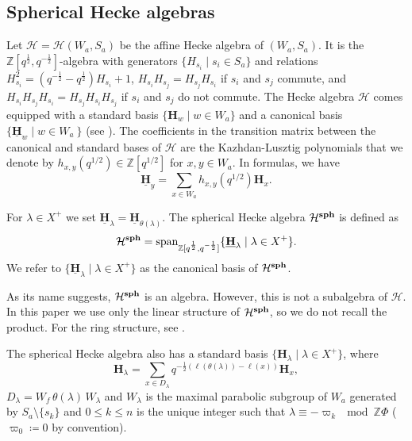 \subsection{Spherical Hecke algebras}


Let $\mathcal{H} = \mathcal{H}(W_{a}, S_a)$  be the affine Hecke algebra of $(W_a,S_a)$. 
It is the $\mathbb{Z}[q^{\frac{1}{2}},q^{-\frac{1}{2}}]$-algebra  with generators $\{H_{s_i} \mid s_i \in S_a\}$ and relations 
$H_{s_i}^2 = (q^{-\frac{1}{2}} -q^{\frac{1}{2}})H_{s_i}+1$, $H_{s_i}H_{s_j}=H_{s_j}H_{s_i}$ if $s_i$ and $s_j$ commute, and   $H_{s_i}H_{s_j}H_{s_{i}} =H_{s_j}H_{s_i}H_{s_j}$ if $s_i$ and $s_j$ do not commute. 
The Hecke algebra $\mathcal{H}$ comes equipped with a  standard basis $\{\mathbf{H}_w \mid w\in W_a\}$ and a canonical basis $\{ \underline{\mathbf{H}}_{w} \mid w\in W_a \ \}$ 
(see \cite{Lusztig1979,Soergel1997KazhdanLusztigPA}).
The coefficients in the transition matrix between the canonical and standard bases of $\mathcal{H}$ are the Kazhdan-Lusztig polynomials that we denote by $h_{x,y}(q^{1/2})\in \mathbb{Z}[q^{1/2}]$ for $x, y \in W_a$. 
In formulas, we have
\begin{equation}
    \underline{\mathbf{H}}_y = \sum_{x\in W_a} h_{x,y}(q^{1/2}) \mathbf{H}_x. 
\end{equation}

\begin{definition}\rm
   For $\lambda \in X^+$ we set 
$\underline{\mathbf{H}}_{\lambda} = \underline{\mathbf{H}}_{\theta (\lambda)}$. 
The spherical Hecke algebra $\mathcal{H}^{\textbf{sph}} $ is defined as
\begin{equation}
    \mathcal{H}^{\textbf{sph}} = \operatorname{span}_{\mathbb{Z}[q^{\frac{1}{2}},q^{-\frac{1}{2}}]} \{ \underline{\mathbf{H}}_{\lambda} \mid \lambda \in X^{+}  \}. 
\end{equation} 
We refer to $ \{ \underline{\mathbf{H}}_{\lambda} \mid \lambda \in X^{+}  \}$ as the canonical basis of $\mathcal{H}^{\textbf{sph}}$. 
\end{definition}

\begin{remark}\rm
As its name suggests, $\mathcal{H}^{\textbf{sph}}$ is an algebra.
However, this is not a subalgebra of $\mathcal{H}$.
In this paper we use only the linear structure of $\mathcal{H}^{\textbf{sph}}$, so we do not recall the product. 
For the ring  structure, see \cite{LPP}.
\end{remark}

The spherical Hecke algebra also has a standard basis $\{ \mathbf{H}_{\lambda} \mid  \lambda \in X^+ \}$, where
\begin{equation}\label{eq: defi standard basis}
     \mathbf{H}_{\lambda} = \sum_{x \in D_{\lambda}} q^{-\frac{1}{2}(\ell(\theta(\lambda)) - \ell(x))} \mathbf{H}_{x},   
\end{equation}
 $D_\lambda= W_f  \,\theta (\lambda) \, W_\lambda$ and 
$W_{\lambda}$ is the maximal parabolic subgroup of $W_{a}$ generated by $S_a\setminus \{s_k\}$ and $0\leq k \leq n$ is the unique integer such that $\lambda \equiv -\varpi_k \mod \mathbb{Z}\Phi$ ($\varpi_0\coloneqq 0$ by convention). 

